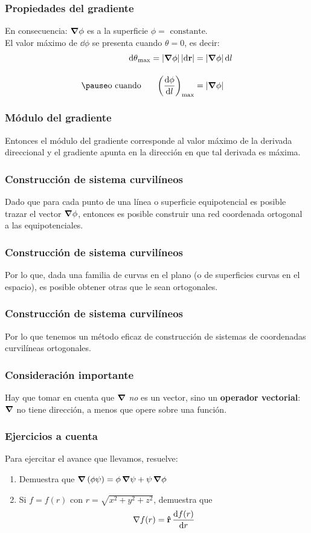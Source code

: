 \documentclass[12pt]{beamer}
\begin{document}
\begin{frame}
\frametitle{Propiedades del gradiente}
En consecuencia: $\grad{\phi}$ es  a la superficie $\phi = \text{ constante}$.
\\
\bigskip
\pause
El valor máximo de $\dd{\phi}$ se presenta cuando $\theta = 0$, es decir:
\pause
\begin{eqnarray*}
\begin{aligned}
\dd{\theta}_{\max} = \abs{\grad{\phi}} \, \abs{\dd{\vb{r}}} &= \abs{\grad{\phi}} \dd{l} \\[1em] \pause
\text{o cuando } \hspace{0.5cm} \left( \dv{\phi}{l} \right)_{\max} &= \abs{\grad{\phi}}
\end{aligned}
\end{eqnarray*}
\end{frame}
\begin{frame}
\frametitle{Módulo del gradiente}
Entonces el módulo del gradiente corresponde al valor máximo de la derivada direccional y el gradiente apunta en la dirección en que tal derivada es máxima.
\end{frame}
\begin{frame}
\frametitle{Construcción de sistema curvilíneos}
Dado que para cada punto de una línea o superficie equipotencial es posible trazar el vector $\grad{\phi}$, entonces es posible construir una red coordenada ortogonal a las equipotenciales.
\end{frame}
\begin{frame}
\frametitle{Construcción de sistema curvilíneos}
Por lo que, dada una familia de curvas en el plano (o de superficies curvas en el espacio), es posible obtener otras que le sean ortogonales.
\end{frame}
\begin{frame}
\frametitle{Construcción de sistema curvilíneos}
Por lo que tenemos un método eficaz de construcción de sistemas de coordenadas curvilíneas ortogonales.
\end{frame}
\begin{frame}
\frametitle{Consideración importante}
Hay que tomar en cuenta que $\grad$ \emph{no} es un vector, sino un \textbf{operador vectorial}: $\grad$ no tiene dirección, a menos que opere sobre una función.
\end{frame}
\begin{frame}
\frametitle{Ejercicios a cuenta}
Para ejercitar el avance que llevamos, resuelve:
\begin{enumerate}
\item Demuestra que $\grad{\left( \phi \psi \right)} = \phi \, \grad{\psi} + \psi \, \grad{\phi}$
\item Si $f = f(r)$ con $r = \sqrt{x^{2} + y^{2}+ z^{2}}$, demuestra que
\begin{align*}
\nabla{f(r)} = \vu{r} \, \dv{f(r)}{r}
\end{align*}
\end{enumerate}
\end{frame}
\end{document}
